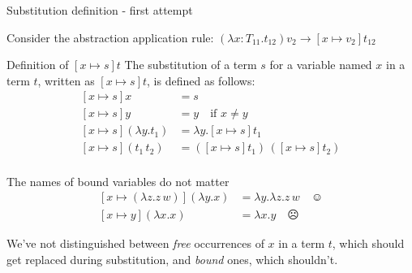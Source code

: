 \documentclass[8pt]{beamer}
\begin{document}
\begin{frame}{Substitution definition - first attempt}

    Consider the abstraction application rule:
        $(\lambda x:T_{11}.t_{12})v_{2} \rightarrow [x \mapsto v_{2}]t_{12}$

    \pause

    \begin{block}{Definition of $[x \mapsto s]t$}
        The substitution of a term $s$ for a variable named $x$ in a term $t$,
        written as $[x \mapsto s]t$, is defined as follows:
        \begin{displaymath}
            \begin{split}
                [x \mapsto s]x &= s \\
                [x \mapsto s]y &= y \quad \text{if } x \not = y\\
                [x \mapsto s](\lambda y.t_{1}) &= \lambda y. [x \mapsto s]t_{1} \\
                [x \mapsto s](t_{1} \, t_{2}) &= 
                    ([x \mapsto s]t_{1})\, ([x \mapsto s]t_{2})\\
            \end{split}
        \end{displaymath}        
    \end{block}

    \pause

    \begin{alertblock}{The names of bound variables do not matter}
        \begin{displaymath}
            \begin{split}
                [x \mapsto (\lambda z. z\, w)](\lambda y.x) &=
                     \lambda y.\lambda z.z\, w \quad \smiley \\
                [x \mapsto y](\lambda x.x) &= \lambda x.y \quad \frownie
            \end{split}
        \end{displaymath}
    \end{alertblock}
    \pause
    We've not distinguished between \emph{free} occurrences of $x$ in a term $t$,
    which should get replaced during substitution, and \emph{bound} ones, which
    shouldn't.
\end{frame}
\end{document}
